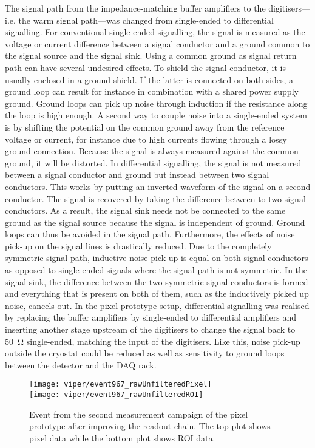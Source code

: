 The signal path from the impedance-matching buffer amplifiers to the digitisers---i.e. the warm signal path---was changed from single-ended to differential signalling.
For conventional single-ended signalling, the signal is measured as the voltage or current difference between a signal conductor and a ground common to the signal source and the signal sink.
Using a common ground as signal return path can have several undesired effects.
To shield the signal conductor, it is usually enclosed in a ground shield.
If the latter is connected on both sides, a ground loop can result for instance in combination with a shared power supply ground.
Ground loops can pick up noise through induction if the resistance along the loop is high enough.
A second way to couple noise into a single-ended system is by shifting the potential on the common ground away from the reference voltage or current, for instance due to high currents flowing through a lossy ground connection.
Because the signal is always measured against the common ground, it will be distorted.
In differential signalling, the signal is not measured between a signal conductor and ground but instead between two signal conductors.
This works by putting an inverted waveform of the signal on a second conductor.
The signal is recovered by taking the difference between to two signal conductors.
As a result, the signal sink needs not be connected to the same ground as the signal source because the signal is independent of ground.
Ground loops can thus be avoided in the signal path.
Furthermore, the effects of noise pick-up on the signal lines is drastically reduced.
Due to the completely symmetric signal path, inductive noise pick-up is equal on both signal conductors as opposed to single-ended signals where the signal path is not symmetric.
In the signal sink, the difference between the two symmetric signal conductors is formed and everything that is present on both of them, such as the inductively picked up noise, cancels out.
In the pixel prototype setup, differential signalling was realised by replacing the buffer amplifiers by single-ended to differential amplifiers and inserting another stage upstream of the digitisers to change the signal back to \SI{50}{\ohm} single-ended, matching the input of the digitisers.
Like this, noise pick-up outside the cryostat could be reduced as well as sensitivity to ground loops between the detector and the DAQ rack.

\begin{figure}[htb]
	\centering
	\texttt{[image: viper/event967\_rawUnfilteredPixel]}\\
	\texttt{[image: viper/event967\_rawUnfilteredROI]}
	\caption{Event from the second measurement campaign of the pixel prototype after improving the readout chain.
	The top plot shows pixel data while the bottom plot shows ROI data.}
	\label{fig:electronics_event-run2}
\end{figure}


